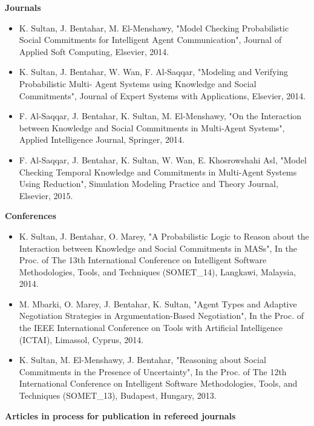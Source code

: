 \textbf{Journals}

\begin{itemize}
\item K. Sultan, J. Bentahar, M. El-Menshawy, "Model Checking Probabilistic Social Commitments for Intelligent Agent Communication", Journal of Applied Soft Computing, Elsevier, 2014.

\item K. Sultan, J. Bentahar, W. Wan, F. Al-Saqqar, "Modeling and Verifying Probabilistic Multi-  Agent Systems using Knowledge and Social Commitments", Journal of Expert Systems with Applications, Elsevier, 2014. 

\item F. Al-Saqqar, J. Bentahar, K. Sultan, M. El-Menshawy, "On the Interaction between Knowledge and Social Commitments in Multi-Agent Systems", Applied Intelligence Journal, Springer, 2014. 
    
\item F. Al-Saqqar, J. Bentahar, K. Sultan, W. Wan, E. Khosrowshahi
Asl, "Model Checking Temporal Knowledge and Commitments in Multi-Agent Systems Using Reduction", Simulation Modeling Practice and Theory Journal, Elsevier, 2015.
\end{itemize}

\textbf{Conferences}

\begin{itemize}

\item K. Sultan, J. Bentahar, O. Marey, "A Probabilistic Logic to Reason about the Interaction between Knowledge and Social Commitments in MASs", In the Proc. of The 13th International Conference on Intelligent Software Methodologies, Tools, and Techniques (SOMET\_14), Langkawi, Malaysia, 2014.

\item M. Mbarki, O. Marey, J. Bentahar, K. Sultan,  "Agent Types and Adaptive Negotiation Strategies in Argumentation-Based Negotiation", In the Proc. of the IEEE International Conference on Tools with Artificial Intelligence (ICTAI), Limassol, Cyprus, 2014.

\item K. Sultan, M. El-Menshawy, J. Bentahar, "Reasoning about Social Commitments in the Presence of Uncertainty", In the Proc. of The 12th International Conference on Intelligent Software Methodologies, Tools, and Techniques (SOMET\_13), Budapest, Hungary, 2013.
\end{itemize}

\textbf{Articles in process for publication in refereed journals}

